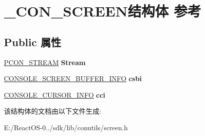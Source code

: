 \hypertarget{struct___c_o_n___s_c_r_e_e_n}{}\section{\+\_\+\+C\+O\+N\+\_\+\+S\+C\+R\+E\+E\+N结构体 参考}
\label{struct___c_o_n___s_c_r_e_e_n}
\subsection*{Public 属性}
\begin{DoxyCompactItemize}
\item 
\mbox{\label{struct___c_o_n___s_c_r_e_e_n_a98d4acd71acbdc51ddd396cf9cd95a3f}} 
\hyperlink{struct___c_o_n___s_t_r_e_a_m}{P\+C\+O\+N\+\_\+\+S\+T\+R\+E\+AM} {\bfseries Stream}
\item 
\mbox{\label{struct___c_o_n___s_c_r_e_e_n_a675c2350fd04ac05a3f02314fd2db10b}} 
\hyperlink{structtag_c_o_n_s_o_l_e___s_c_r_e_e_n___b_u_f_f_e_r___i_n_f_o}{C\+O\+N\+S\+O\+L\+E\+\_\+\+S\+C\+R\+E\+E\+N\+\_\+\+B\+U\+F\+F\+E\+R\+\_\+\+I\+N\+FO} {\bfseries csbi}
\item 
\mbox{\label{struct___c_o_n___s_c_r_e_e_n_a90b0820ad27217590f45d5b88554637d}} 
\hyperlink{structtag_c_o_n_s_o_l_e___c_u_r_s_o_r___i_n_f_o}{C\+O\+N\+S\+O\+L\+E\+\_\+\+C\+U\+R\+S\+O\+R\+\_\+\+I\+N\+FO} {\bfseries cci}
\end{DoxyCompactItemize}


该结构体的文档由以下文件生成\+:\begin{DoxyCompactItemize}
\item 
E\+:/\+React\+O\+S-\/0../sdk/lib/conutils/screen.\+h\end{DoxyCompactItemize}
